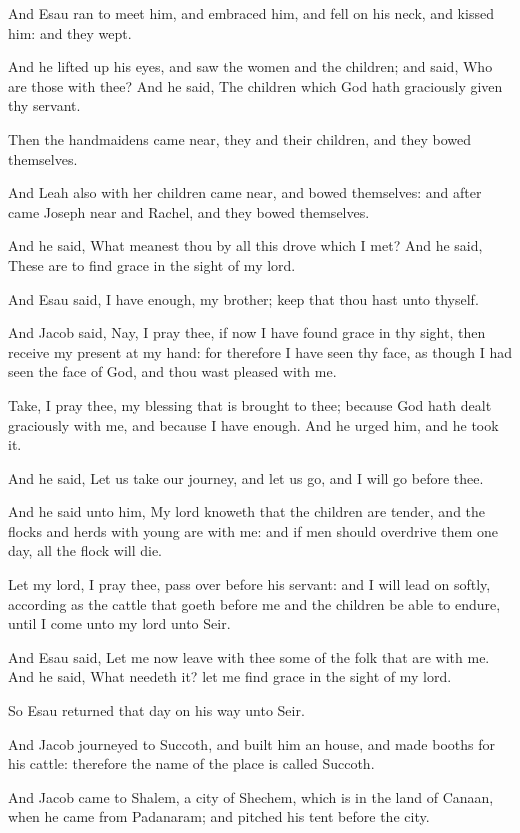 \verse And Esau ran to meet him, and embraced him, and fell on his neck, and kissed him: and they wept.

\verse And he lifted up his eyes, and saw the women and the children; and said, Who are those with thee? And he said, The children which God hath graciously given thy servant.

\verse Then the handmaidens came near, they and their children, and they bowed themselves.

\verse And Leah also with her children came near, and bowed themselves: and after came Joseph near and Rachel, and they bowed themselves.

\verse And he said, What meanest thou by all this drove which I met? And he said, These are to find grace in the sight of my lord.

\verse And Esau said, I have enough, my brother; keep that thou hast unto thyself.

\verse And Jacob said, Nay, I pray thee, if now I have found grace in thy sight, then receive my present at my hand: for therefore I have seen thy face, as though I had seen the face of God, and thou wast pleased with me.

\verse Take, I pray thee, my blessing that is brought to thee; because God hath dealt graciously with me, and because I have enough. And he urged him, and he took it.

\verse And he said, Let us take our journey, and let us go, and I will go before thee.

\verse And he said unto him, My lord knoweth that the children are tender, and the flocks and herds with young are with me: and if men should overdrive them one day, all the flock will die.

\verse Let my lord, I pray thee, pass over before his servant: and I will lead on softly, according as the cattle that goeth before me and the children be able to endure, until I come unto my lord unto Seir.

\verse And Esau said, Let me now leave with thee some of the folk that are with me. And he said, What needeth it? let me find grace in the sight of my lord.

\verse So Esau returned that day on his way unto Seir.

\verse And Jacob journeyed to Succoth, and built him an house, and made booths for his cattle: therefore the name of the place is called Succoth.

\verse And Jacob came to Shalem, a city of Shechem, which is in the land of Canaan, when he came from Padanaram; and pitched his tent before the city.

